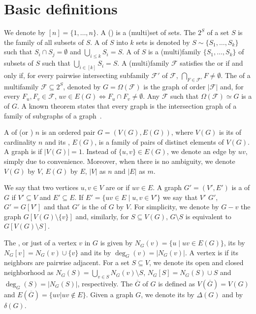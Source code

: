 \section{Basic definitions}
\label{sec:basic_defs}

We denote by $[n] = \{1, \dots, n\}$.
A () is a (multi)set of sets.
The  $2^S$ of a set $S$ is the family of all subsets of $S$.
A  of $S$ into $k$ sets is denoted by $S \sim \{S_1, \dots, S_k\}$ such that $S_i \cap S_j = \emptyset$ and $\bigcup_{i \leq k} S_i = S$.
A  of $S$ is a (multi)family $\{S_1, \dots, S_k\}$ of subsets of $S$ such that $\bigcup_{i \in [k]} S_i = S$.
A (multi)family $\mathcal{F}$ satisfies the  or  if and only if, for every pairwise intersecting subfamily $\mathcal{F}'$ of $\mathcal{F}$, $\bigcap_{F \in \mathcal{F}'} F \neq \emptyset$.
The  of a multifamily $\mathcal{F} \subseteq 2^S$, denoted by $G = \Omega(\mathcal{F})$ is the graph of order $|\mathcal{F}|$ and, for every $F_u, F_v \in \mathcal{F}$, $uv \in E(G) \Leftrightarrow F_u \cap F_v \neq \emptyset$.
Any $\mathcal{F}$ such that $\Omega(\mathcal{F}) \simeq G$ is a  of $G$.
A known theorem states that every graph is the intersection graph of a family of subgraphs of a graph~\citep{intersection_graphs}.

A  of  (or ) $n$ is an ordered pair $G = (V(G), E(G))$, where $V(G)$ is its  of cardinality $n$ and its , $E(G)$, is a family of pairs of distinct elements of $V(G)$. A graph is  if $|V(G)| = 1$.
Instead of $\{u,v\} \in E(G)$, we denote an edge by $uv$, simply due to convenience. Moreover, when there is no ambiguity, we denote $V(G)$ by $V$, $E(G)$ by $E$, $|V|$ as $n$ and $|E|$ as $m$.

We say that two vertices $u,v \in V$ are  or  if $uv \in E$.
A graph $G' = (V', E')$ is a  of $G$ if $V' \subseteq V$ and $E' \subseteq E$.
If $E' = \{uv \in E \mid u,v \in V'\}$ we say that $V'$  $G'$, $G' = G[V']$ and that $G'$ is the  of $G$ by $V$.
For simplicity, we denote by $G - v$ the graph $G[V(G) \setminus \{v\}]$ and, similarly, for $S \subseteq V(G)$, $G \setminus S$ is equivalent to $G[V(G) \setminus S]$.

The , or just  of a vertex $v$ in $G$ is given by $N_G(v) = \{u \mid uv \in E(G)\}$, its  by $N_G[v] = N_G(v) \cup \{v\}$ and its  by $\deg_G(v) = |N_G(v)|$.
A vertex is  if its neighbors are pairwise adjacent.
For a set $S \subseteq V$, we denote its open and closed neighborhood as $N_G(S) = \bigcup_{v \in S} N_G(v) \setminus S$, $N_G[S] = N_G(S) \cup S$ and $\deg_G(S) = |N_G(S)|$, respectively.
The  $\overline{G}$ of $G$ is defined as $V(\overline{G}) = V(G)$ and $E(\overline{G}) = \{uv | uv \notin E\}$.
Given a graph $G$, we denote its  by $\Delta(G)$ and  by $\delta(G)$.

